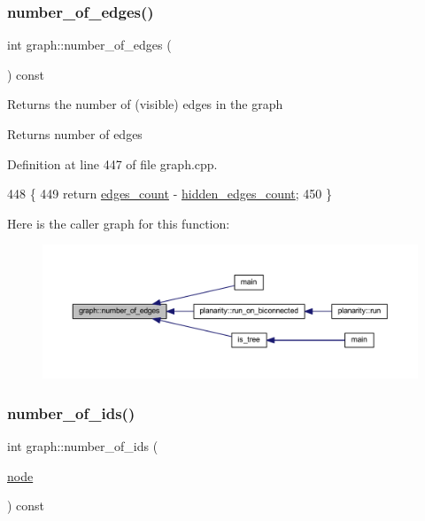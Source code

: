 \subsubsection{\texorpdfstring{number\+\_\+of\+\_\+edges()}{number\_of\_edges()}}
{\footnotesize\ttfamily int graph\+::number\+\_\+of\+\_\+edges (\begin{DoxyParamCaption}{ }\end{DoxyParamCaption}) const}

Returns the number of (visible) edges in the graph

\begin{DoxyReturn}{Returns}
number of edges 
\end{DoxyReturn}


Definition at line 447 of file graph.\+cpp.


\begin{DoxyCode}
448 \{
449     \textcolor{keywordflow}{return} \mbox{\hyperlink{classgraph_af560ff4263ad165c166a46084e781b4a}{edges\_count}} - \mbox{\hyperlink{classgraph_a3151f544e049fbd985204ca9d8f74c97}{hidden\_edges\_count}};
450 \}
\end{DoxyCode}
Here is the caller graph for this function\+:
\nopagebreak
\begin{figure}[H]
\begin{center}
\leavevmode
\includegraphics[width=350pt]{classgraph_aa4fcbe7bf572dc800068873ccfb4d95a_icgraph}
\end{center}
\end{figure}
\mbox{\label{classgraph_a82f09714f50dbe41e1a9cbcb12ad0866}} 
\subsubsection{\texorpdfstring{number\+\_\+of\+\_\+ids()}{number\_of\_ids()}\hspace{0.1cm}{\footnotesize\ttfamily [1/2]}}
{\footnotesize\ttfamily int graph\+::number\+\_\+of\+\_\+ids (\begin{DoxyParamCaption}\item[{\mbox{\hyperlink{classnode}{node}}}]{ }\end{DoxyParamCaption}) const}




